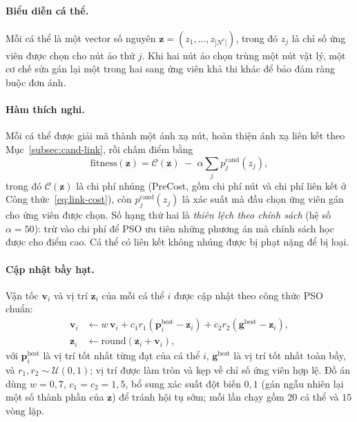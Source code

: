 \documentclass[../DoAn.tex]{subfiles}
\begin{document}
\paragraph{Biểu diễn cá thể.} Mỗi cá thể là một vector số nguyên $\mathbf{z}=(z_1,\ldots,z_{|N^v|})$, trong đó $z_j$ là chỉ số ứng viên được chọn cho nút ảo thứ $j$. Khi hai nút ảo chọn trùng một nút vật lý, một cơ chế sửa gán lại một trong hai sang ứng viên khả thi khác để bảo đảm ràng buộc đơn ánh.

\paragraph{Hàm thích nghi.} Mỗi cá thể được giải mã thành một ánh xạ nút, hoàn thiện ánh xạ liên kết theo Mục~\ref{subsec:cand-link}, rồi chấm điểm bằng
\begin{equation}
\mathrm{fitness}(\mathbf{z}) = \mathcal{C}(\mathbf{z}) \;-\; \alpha \sum_{j} p^{\text{cand}}_{j}(z_j),
\label{eq:pso-fitness}
\end{equation}
trong đó $\mathcal{C}(\mathbf{z})$ là chi phí nhúng (PreCost, gồm chi phí nút và chi phí liên kết ở Công thức~\eqref{eq:link-cost}), còn $p^{\text{cand}}_{j}(z_j)$ là xác suất mà đầu chọn ứng viên gán cho ứng viên được chọn. Số hạng thứ hai là \textit{thiên lệch theo chính sách} (hệ số $\alpha=50$): trừ vào chi phí để PSO ưu tiên những phương án mà chính sách học được cho điểm cao. Cá thể có liên kết không nhúng được bị phạt nặng để bị loại.

\paragraph{Cập nhật bầy hạt.} Vận tốc $\mathbf{v}_i$ và vị trí $\mathbf{z}_i$ của mỗi cá thể $i$ được cập nhật theo công thức PSO chuẩn:
\begin{align}
\mathbf{v}_i &\leftarrow w\,\mathbf{v}_i + c_1 r_1 (\mathbf{p}^{\text{best}}_i - \mathbf{z}_i) + c_2 r_2 (\mathbf{g}^{\text{best}} - \mathbf{z}_i),\\
\mathbf{z}_i &\leftarrow \mathrm{round}(\mathbf{z}_i + \mathbf{v}_i),
\end{align}
với $\mathbf{p}^{\text{best}}_i$ là vị trí tốt nhất từng đạt của cá thể $i$, $\mathbf{g}^{\text{best}}$ là vị trí tốt nhất toàn bầy, và $r_1, r_2 \sim \mathcal{U}(0,1)$; vị trí được làm tròn và kẹp về chỉ số ứng viên hợp lệ. Đồ án dùng $w=0{,}7$, $c_1=c_2=1{,}5$, bổ sung xác suất đột biến $0{,}1$ (gán ngẫu nhiên lại một số thành phần của $\mathbf{z}$) để tránh hội tụ sớm; mỗi lần chạy gồm $20$ cá thể và $15$ vòng lặp.
\end{document}
